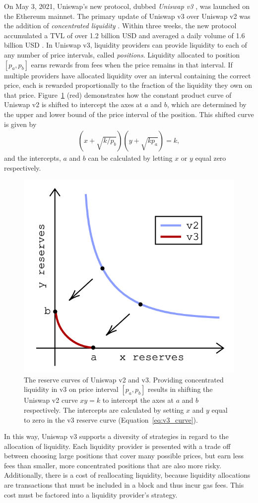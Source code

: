 \documentclass[sigconf, usenames, dvipsnames]{acmart}
\begin{document}
On May 3, 2021, Uniswap's new protocol, dubbed {\em Uniswap v3} \cite{adams2021uniswap}, was launched on the Ethereum mainnet. The primary update of Uniswap v3 over Uniswap v2 was the addition of  \textit{concentrated liquidity} \cite{adams2021uniswap}. Within three weeks, the new protocol  accumulated a TVL of over 1.2 billion USD and averaged a daily volume of 1.6 billion USD \cite{univ3_analytics}. 
%
In Uniswap v3, liquidity providers can provide liquidity to each of any number of price intervals, called {\em positions}. Liquidity allocated to position $[p_a,p_b]$ earns rewards from fees when the price remains in that interval. If multiple providers have allocated liquidity over an interval containing the correct price, each is rewarded proportionally to the fraction of the liquidity they own on that price.
%
Figure~\ref{fig:v2v3} (red) demonstrates how the constant product curve of Uniswap v2 is shifted to intercept the axes at $a$ and $b$, which are determined by the upper and lower bound of the price interval of the position. This shifted curve \cite{adams2021uniswap} is given by
\begin{align}\label{eq:v3_curve}
    \left(x + \sqrt{k / p_b} \right) \left(y +\sqrt{k p_a}\right) = k,
\end{align}
and the intercepts, $a$ and $b$ can be calculated by letting $x$ or $y$ equal zero respectively.
%
\begin{figure}
    \centering
    \includegraphics[width=0.5\linewidth]{img/v2v3.png}
    \caption{The reserve curves of Uniswap v2 and v3. Providing concentrated liquidity in v3 on price interval $[p_a,p_b]$ results in shifting the Uniswap v2 curve $xy=k$ to intercept the axes at $a$ and $b$ respectively. The intercepts are calculated by setting $x$ and $y$ equal to zero in the v3 reserve curve (Equation~\ref{eq:v3_curve}).
    \label{fig:v2v3}}
\end{figure}


In this way, Uniswap v3 supports a diversity of strategies in regard to the allocation of  liquidity. Each liquidity provider is presented with a trade off between choosing large positions that cover many possible prices, but earn less fees than smaller, more concentrated positions that are also more risky. 
Additionally, there is a cost of reallocating liquidity, because liquidity allocations are transactions that must be included in a block and thus incur gas fees. This cost must be factored into a liquidity provider's strategy.  
\end{document}
